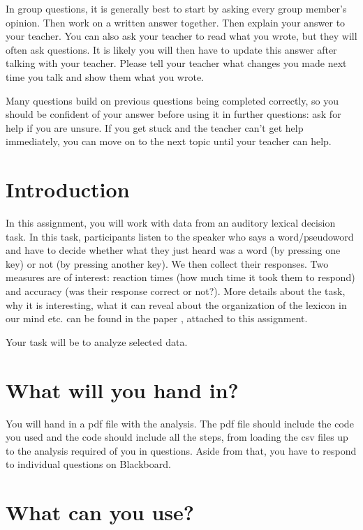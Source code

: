 \documentclass{article}\usepackage[]{graphicx}\usepackage[]{color}
\begin{document}
In group questions, it is generally best to start by asking every group member's opinion. Then work on a written answer together. Then explain your answer to your teacher. You can also ask your teacher to read what you wrote, but they will often ask questions. It is likely you will then have to update this answer after talking with your teacher. Please tell your teacher what changes you made next time you talk and show them what you wrote.

Many questions build on previous questions being completed correctly, so you should be confident of your answer before using it in further questions: ask for help if you are unsure. If you get stuck and the teacher can't get help immediately, you can move on to the next topic until your teacher can help.

\section{Introduction}

In this assignment, you will work with data from an auditory lexical decision task. In this task, participants listen to the speaker who says a word/pseudoword and have to decide whether what they just heard was a word (by pressing one key) or not (by pressing another key). We then collect their responses. Two measures are of interest: reaction times (how much time it took them to respond) and accuracy (was their response correct or not?). More details about the task, why it is interesting, what it can reveal about the organization of the lexicon in our mind etc. can be found in the paper \cite{tucker+19}, attached to this assignment.

Your task will be to analyze selected data.

\section{What will you hand in?}

You will hand in a pdf file with the analysis. The pdf file should include the
code you used and the code should include all the steps, from loading the csv files up to the analysis required of you in questions. Aside from that, you have to respond to individual questions on Blackboard.

\section{What can you use?}
\end{document}
